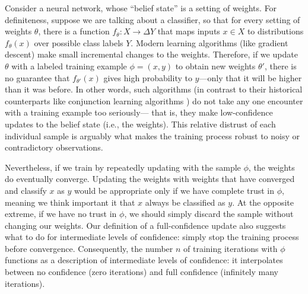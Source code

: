 \documentclass{uai2023}
\let\parencite\citep
\theoremstyle{plain}
\theoremstyle{definition}
\newcommand\commentout[1]{}
\begin{document}
\begin{example}\label{ex:classifier}
Consider a neural network, whose ``belief state'' is a setting of weights.
For definiteness, suppose we are talking about a classifier, so that for every setting of weights $\theta$, there is a function
$f_\theta : X \to \Delta Y$ that maps inputs $x \in X$ to
distributions $f_\theta(x)$ over possible class labels $Y$.  
Modern learning algorithms (like gradient descent) make small incremental changes to the weights.
Therefore, if we update $\theta$ with a labeled training example $\phi = (x,y)$ to obtain new weights $\theta'$, there is no guarantee that $f_{\theta'}(x)$ gives high probability to $y$---only that it will be higher than it was before.
In other words, such algorithms 
(in contrast to their historical counterparts like conjunction learning algorithms \parencite{conjunctions}) 
do not take any one encounter with a training example too seriously---
\unskip that is, they make low-confidence updates to the belief state
(i.e., the weights).    
This relative distrust of each individual sample is arguably what makes the training process robust to noisy or contradictory observations.
\commentout{
	As a result,
	there is a significant difference between going through the training data once
\unskip, and doing so many times.}


Nevertheless, 
if we train by repeatedly updating with the sample $\phi$, 
the weights do eventually converge.
Updating the weights with weights that have converged and classify $x$
as $y$ would be appropriate only if we have
complete trust in $\phi$, meaning we think important it that $x$ always
be classified as $y$. 
At the opposite extreme, if we have no trust in $\phi$, we should
simply discard the sample without changing our weights.  
Our definition of a full-confidence update 
also suggests what to do for intermediate levels of confidence:
simply stop the training process before convergence. 
Consequently, the number $n$ of training iterations with $\phi$
functions as a description of 
intermediate levels of confidence: it interpolates
between no confidence (zero iterations) and full confidence
(infinitely many iterations). 


\end{example}
\end{document}
